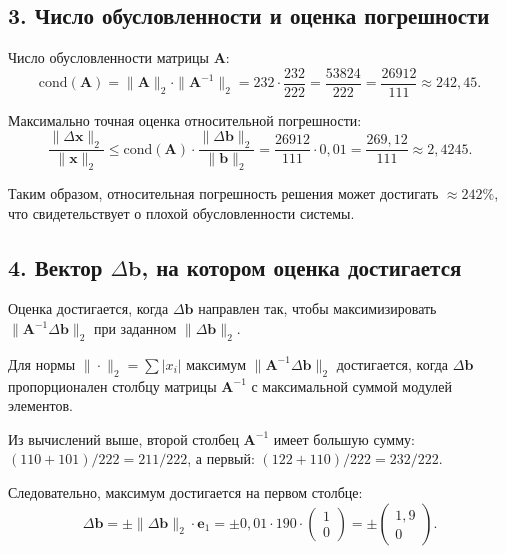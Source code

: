 \documentclass{article}
\begin{document}
\subsection*{3. Число обусловленности и оценка погрешности}

Число обусловленности матрицы $\mathbf{A}$:
\begin{equation}
\text{cond}(\mathbf{A}) = \|\mathbf{A}\|_2 \cdot \|\mathbf{A}^{-1}\|_2 = 232 \cdot \frac{232}{222} = \frac{53824}{222} = \frac{26912}{111} \approx 242{,}45.
\end{equation}

Максимально точная оценка относительной погрешности:
\begin{equation}
\frac{\|\Delta\mathbf{x}\|_2}{\|\mathbf{x}\|_2} \leqslant \text{cond}(\mathbf{A}) \cdot \frac{\|\Delta\mathbf{b}\|_2}{\|\mathbf{b}\|_2} = \frac{26912}{111} \cdot 0{,}01 = \frac{269{,}12}{111} \approx 2{,}4245.
\end{equation}

Таким образом, относительная погрешность решения может достигать $\approx 242\%$, что свидетельствует о плохой обусловленности системы.

\subsection*{4. Вектор $\Delta\mathbf{b}$, на котором оценка достигается}

Оценка достигается, когда $\Delta\mathbf{b}$ направлен так, чтобы максимизировать $\|\mathbf{A}^{-1}\Delta\mathbf{b}\|_2$ при заданном $\|\Delta\mathbf{b}\|_2$.

Для нормы $\|\cdot\|_2 = \sum |x_i|$ максимум $\|\mathbf{A}^{-1}\Delta\mathbf{b}\|_2$ достигается, когда $\Delta\mathbf{b}$ пропорционален столбцу матрицы $\mathbf{A}^{-1}$ с максимальной суммой модулей элементов.

Из вычислений выше, второй столбец $\mathbf{A}^{-1}$ имеет большую сумму: $(110 + 101)/222 = 211/222$, а первый: $(122 + 110)/222 = 232/222$.

Следовательно, максимум достигается на первом столбце:
\begin{equation}
\Delta\mathbf{b} = \pm \|\Delta\mathbf{b}\|_2 \cdot \mathbf{e}_1 = \pm 0{,}01 \cdot 190 \cdot \begin{pmatrix} 1 \\ 0 \end{pmatrix} = \pm \begin{pmatrix} 1{,}9 \\ 0 \end{pmatrix}.
\end{equation}
\end{document}
